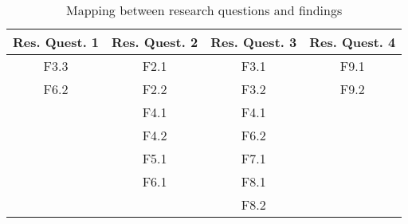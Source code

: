 \begin{table}[htb]
\centering
\begin{tabular}{|c|c|c|c|}\hline
{\bf Res. Quest. 1} & {\bf Res. Quest. 2} & {\bf Res. Quest. 3} & {\bf Res. Quest. 4}\\ \hline
F3.3 & F2.1 & F3.1 & F9.1\\ \hline
F6.2 & F2.2 & F3.2 & F9.2\\ \hline
		 & F4.1 & F4.1 &\\ \hline
		 & F4.2	& F6.2 &\\ \hline
		 & F5.1 & F7.1 &\\ \hline
		 & F6.1 & F8.1 &\\ \hline
		 & 			& F8.2 &\\ \hline		
\end{tabular}
\caption{Mapping between research questions and findings}
\label{tab:mapping}
\vspace{-.4cm}
\end{table}



%
